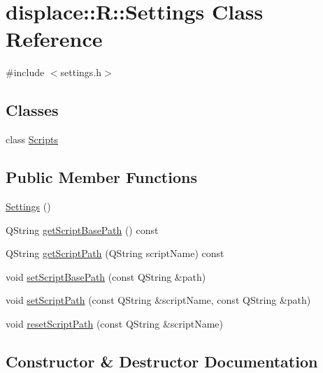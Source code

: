\hypertarget{classdisplace_1_1_r_1_1_settings}{}\section{displace\+::R\+::Settings Class Reference}
\label{classdisplace_1_1_r_1_1_settings}


{\ttfamily \#include $<$settings.\+h$>$}

\subsection*{Classes}
\begin{DoxyCompactItemize}
\item 
class \mbox{\hyperlink{classdisplace_1_1_r_1_1_settings_1_1_scripts}{Scripts}}
\end{DoxyCompactItemize}
\subsection*{Public Member Functions}
\begin{DoxyCompactItemize}
\item 
\mbox{\hyperlink{classdisplace_1_1_r_1_1_settings_ab78bb7b62270f446954a09414375c21a}{Settings}} ()
\item 
Q\+String \mbox{\hyperlink{classdisplace_1_1_r_1_1_settings_ae32d673d0bf612c8c7fa37333699b4c5}{get\+Script\+Base\+Path}} () const
\item 
Q\+String \mbox{\hyperlink{classdisplace_1_1_r_1_1_settings_a13e35a1035d81b09363c5cd1f39d8410}{get\+Script\+Path}} (Q\+String script\+Name) const
\item 
void \mbox{\hyperlink{classdisplace_1_1_r_1_1_settings_a03496fdb1e39f653fb407a2eb5a0b8bc}{set\+Script\+Base\+Path}} (const Q\+String \&path)
\item 
void \mbox{\hyperlink{classdisplace_1_1_r_1_1_settings_a77fa020ac605f9b1c609e7424f0a4d0d}{set\+Script\+Path}} (const Q\+String \&script\+Name, const Q\+String \&path)
\item 
void \mbox{\hyperlink{classdisplace_1_1_r_1_1_settings_a532f3a90d0c99b9e210aa34d9704830f}{reset\+Script\+Path}} (const Q\+String \&script\+Name)
\end{DoxyCompactItemize}


\subsection{Constructor \& Destructor Documentation}
\mbox{\label{classdisplace_1_1_r_1_1_settings_ab78bb7b62270f446954a09414375c21a}} 
